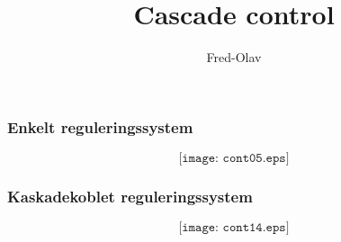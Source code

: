 \documentclass{beamer}
\title{Cascade control}
\author{Fred-Olav}
\begin{document}
\maketitle

\begin{frame}
	\frametitle{Enkelt reguleringssystem}

	
$$\texttt{[image: cont05.eps]}$$

\end{frame}





\begin{frame}
	\frametitle{Kaskadekoblet reguleringssystem}

	
$$\texttt{[image: cont14.eps]}$$

\end{frame}







\end{document}

